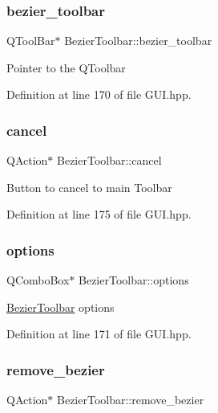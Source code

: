 \subsubsection{\texorpdfstring{bezier\+\_\+toolbar}{bezier\_toolbar}}
{\footnotesize\ttfamily Q\+Tool\+Bar$\ast$ Bezier\+Toolbar\+::bezier\+\_\+toolbar}

Pointer to the Q\+Toolbar 

Definition at line 170 of file G\+U\+I.\+hpp.

\mbox{\label{structBezierToolbar_a5c91775ecfd6725f3707b5b838bcbbf9}} 
\subsubsection{\texorpdfstring{cancel}{cancel}}
{\footnotesize\ttfamily Q\+Action$\ast$ Bezier\+Toolbar\+::cancel}

Button to cancel to main Toolbar 

Definition at line 175 of file G\+U\+I.\+hpp.

\mbox{\label{structBezierToolbar_a84666bca25e5b6c194adaf0461c30ec3}} 
\subsubsection{\texorpdfstring{options}{options}}
{\footnotesize\ttfamily Q\+Combo\+Box$\ast$ Bezier\+Toolbar\+::options}

\mbox{\hyperlink{structBezierToolbar}{Bezier\+Toolbar}} options 

Definition at line 171 of file G\+U\+I.\+hpp.

\mbox{\label{structBezierToolbar_a1e1fd77e3baf09d382973b1ede4247cd}} 
\subsubsection{\texorpdfstring{remove\+\_\+bezier}{remove\_bezier}}
{\footnotesize\ttfamily Q\+Action$\ast$ Bezier\+Toolbar\+::remove\+\_\+bezier}

